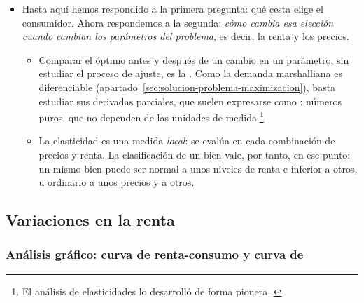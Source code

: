 \documentclass[11pt]{article}
\begin{document}
\begin{itemize}
\item Hasta aquí hemos respondido a la primera pregunta: qué cesta elige el consumidor. Ahora respondemos a la segunda: \emph{cómo cambia esa elección cuando cambian los parámetros del problema}, es decir, la renta y los precios.
  \begin{itemize}
  \item Comparar el óptimo antes y después de un cambio en un parámetro, sin estudiar el proceso de ajuste, es la . Como la demanda marshalliana es diferenciable (apartado~\ref{sec:solucion-problema-maximizacion}), basta estudiar sus derivadas parciales, que suelen expresarse como : números puros, que no dependen de las unidades de medida.\footnote{El análisis de elasticidades lo desarrolló de forma pionera \textcite[libro~III, cap.~IV]{Marshall1890Principles}.}
  \item La elasticidad es una medida \emph{local}: se evalúa en cada combinación de precios y renta. La clasificación de un bien vale, por tanto, en ese punto: un mismo bien puede ser normal a unos niveles de renta e inferior a otros, u ordinario a unos precios y  a otros.
  \end{itemize}
\end{itemize}

\subsection{Variaciones en la renta}\label{sec:variaciones-renta}

\subsubsection{Análisis gráfico: curva de renta-consumo y curva de }\label{sec:analisis-grafico-curva}
\end{document}
